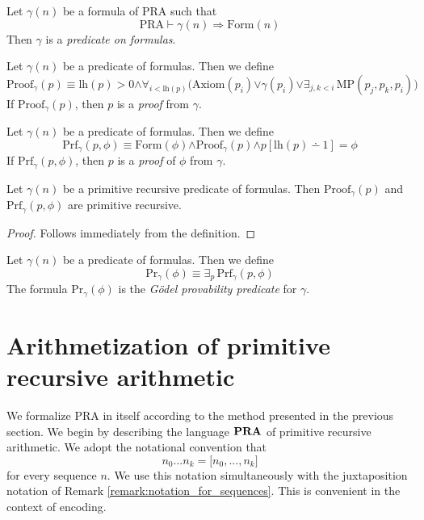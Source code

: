 \documentclass[10pt]{amsart}
\newcommand{\mforall}{\boldsymbol{\forall}}
\newcommand{\mexists}{\boldsymbol{\exists}}
\newcommand{\mra}{\boldsymbol{\Rightarrow}}
\newcommand{\mand}{\boldsymbol{\wedge}}
\newcommand{\mor}{\boldsymbol{\vee}}
\newcommand{\mle}{\boldsymbol{<}}
\newcommand{\mge}{\boldsymbol{>}}
\newcommand{\meq}{\boldsymbol{=}}
\begin{document}
\begin{definition}
	Let $\gamma(n)$ be a formula of $\mathrm{PRA}$ such that
	$$\mathrm{PRA} \vdash \gamma(n) \mra \mathrm{Form}(n)$$
	Then $\gamma$ is a \textit{predicate on formulas}.
\end{definition}

\begin{definition}
	Let $\gamma(n)$ be a predicate of formulas. Then we define
	$$\mathrm{Proof}_{\gamma}(p) \equiv \mathrm{lh}(p) \mge 0 \mand \mforall_{i \mle \mathrm{lh}(p)}\bigl(\mathrm{Axiom}(p_i) \mor \gamma(p_i) \mor \mexists_{j,k \mle i}\,\mathrm{MP}(p_j,p_k,p_i)\bigr)$$
	If $\mathrm{Proof}_{\gamma}(p)$, then $p$ is a \textit{proof} from $\gamma$.
\end{definition}

\begin{definition}
	Let $\gamma(n)$ be a predicate of formulas. Then we define
	$$\mathrm{Prf}_{\gamma}(p,\phi) \equiv \mathrm{Form}(\phi) \mand \mathrm{Proof}_{\gamma}(p) \mand p[\mathrm{lh}(p)\dotminus 1] \meq \phi$$
	If $\mathrm{Prf}_{\gamma}(p,\phi)$, then $p$ is a \textit{proof} of $\phi$ from $\gamma$.
\end{definition}

\begin{fact}\label{fact:proof_predicates_are_primitive_recursive_if_extralogical_axioms_are_primitive_recursive}
	Let $\gamma(n)$ be a primitive recursive predicate of formulas. Then $\mathrm{Proof}_{\gamma}(p)$ and $\mathrm{Prf}_{\gamma}(p, \phi)$ are primitive recursive.
\end{fact}
\begin{proof}
	Follows immediately from the definition.
\end{proof}

\begin{definition}
	Let $\gamma(n)$ be a predicate of formulas. Then we define
	$$\mathrm{Pr}_{\gamma}(\phi) \equiv \mexists_p\,\mathrm{Prf}_{\gamma}(p,\phi)$$
	The formula $\mathrm{Pr}_{\gamma}(\phi)$ is the \textit{G{\"o}del provability predicate} for $\gamma$.
\end{definition}

\section{Arithmetization of primitive recursive arithmetic}
\noindent
We formalize $\mathrm{PRA}$ in itself according to the method presented in the previous section. We begin by describing the language $\mathbf{PRA}$ of primitive recursive arithmetic. We adopt the notational convention that
$$n_0...n_k \meq \pmb{[}n_0,...,n_k\pmb{]}$$
for every sequence $n$. We use this notation simultaneously with the juxtaposition notation of Remark \ref{remark:notation_for_sequences}. This is convenient in the context of encoding.
\end{document}
